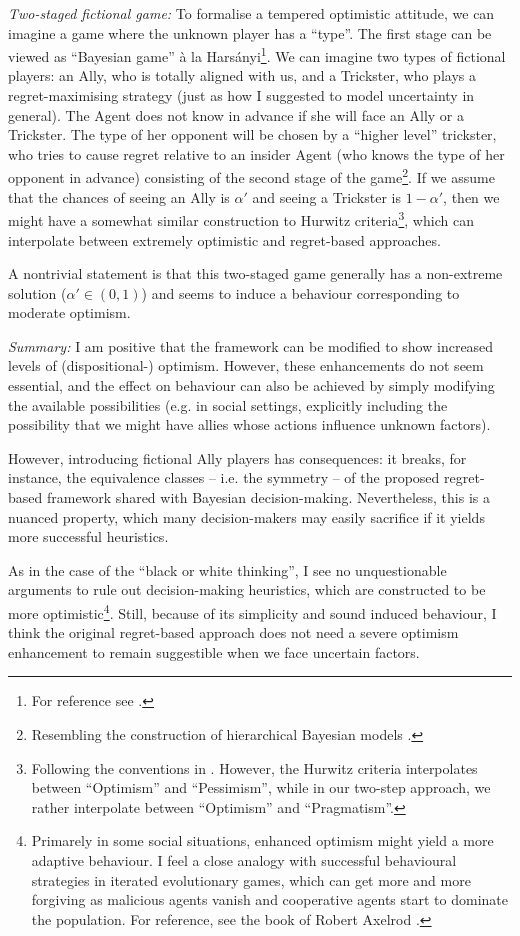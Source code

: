 \documentclass{article}
\begin{document}
{\it Two-staged fictional game:}
To formalise a tempered optimistic attitude, we can imagine a game where the unknown player has a ``type''. The first stage can be viewed as ``Bayesian game'' à la Harsányi\footnote{For reference see \cite{paper:Harsanyi_I,paper:Harsanyi_II,paper:Harsanyi_III,paper:ZamirBayesianGames}.}. We can imagine two types of fictional players: an Ally, who is totally aligned with us, and a Trickster, who plays a regret-maximising strategy (just as how I suggested to model uncertainty in general).
The Agent does not know in advance if she will face an Ally or a Trickster. The type of her opponent will be chosen by a ``higher level'' trickster, who tries to cause regret relative to an insider Agent (who knows the type of her opponent in advance) consisting of the second stage of the game\footnote{Resembling the construction of hierarchical Bayesian models \cite{book:BayesianDataAnalysis}.}.
If we assume that the chances of seeing an Ally is $\alpha'$ and seeing a Trickster is $1-\alpha'$, then we might have a somewhat similar construction to Hurwitz criteria\footnote{Following the conventions in \cite{paper:Milnor}. However, the Hurwitz criteria interpolates between ``Optimism'' and ``Pessimism'', while in our two-step approach, we rather interpolate between ``Optimism'' and ``Pragmatism''.}, which can interpolate between extremely optimistic and regret-based approaches.

A nontrivial statement is that this two-staged game generally has a non-extreme solution ($\alpha' \in (0,1)$) and seems to induce a behaviour corresponding to moderate optimism.

{\it Summary:}
I am positive that the framework can be modified to show increased levels of (dispositional-) optimism. 
However, these enhancements do not seem essential, and the effect on behaviour can also be achieved by simply modifying the available possibilities (e.g. in social settings, explicitly including the possibility that we might have allies whose actions influence unknown factors).

However, introducing fictional Ally players has consequences: it breaks, for instance, the equivalence classes -- i.e. the symmetry -- of the proposed regret-based framework shared with Bayesian decision-making.
Nevertheless, this is a nuanced property, which many decision-makers may easily sacrifice if it yields more successful heuristics.

As in the case of the ``black or white thinking'', I see no unquestionable arguments to rule out decision-making heuristics, which are constructed to be more optimistic\footnote{Primarely in some social situations, enhanced optimism might yield a more adaptive behaviour. I feel a close analogy with successful behavioural strategies in iterated evolutionary games, which can get more and more forgiving as malicious agents vanish and cooperative agents start to dominate the population. For reference, see the book of Robert Axelrod \cite{book:Axelrod}.}. Still, because of its simplicity and sound induced behaviour, I think the original regret-based approach does not need a severe optimism enhancement to remain suggestible when we face uncertain factors.
\end{document}
